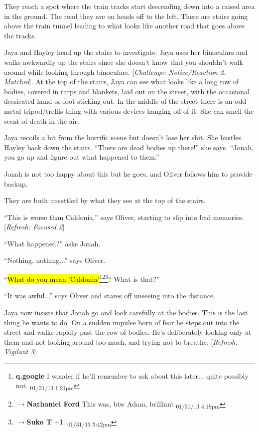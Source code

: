 They reach a spot where the train tracks start descending down into a raised area in the ground.  The road they are on heads off to the left. There are stairs going above the train tunnel leading to what looks like another road that goes above the tracks.



Jaya and Hayley head up the stairs to investigate.  Jaya uses her binoculars and walks awkwardly up the stairs since she doesn't know that you shouldn't walk around while looking through binoculars. {[}\textit{Challenge: Notice/Reaction 2.  Matched}{]}.  At the top of the stairs, Jaya can see what looks like a long row of bodies, covered in tarps and blankets, laid out on the street, with the occasional dessicated hand or foot sticking out.  In the middle of the street there is an odd metal tripod/trellis thing with various devices hanging off of it. She can smell the scent of death in the air. 



Jaya recoils a bit from the horrific scene but doesn't lose her shit. She hustles Hayley back down the stairs.  ``There are dead bodies up there!'' she says.  ``Jonah, you go up and figure out what happened to them.''

Jonah is not too happy about this but he goes, and Oliver follows him to provide backup.



They are both unsettled by what they see at the top of the stairs. 

``This is worse than Caldonia,'' says Oliver, starting to slip into bad memories. {[}\textit{Refresh: Focused 2}{]}

``What happened?'' asks Jonah.

``Nothing, nothing...'' says Oliver.

``\hl{What do you mean 'Caldonia'}\footnote{\textbf{q.google }I wonder if he'll remember to ask about this later...  quite possibly not. \textsubscript{01/31/13 1:21pm}}\footnote{$\rightarrow$\textbf{Nathaniel Ford }This was, btw Adam, brilliant \textsubscript{01/31/13 4:19pm}}\footnote{$\rightarrow$\textbf{Suko T }+1. \textsubscript{01/31/13 5:42pm}}?  What is that?''

``It was awful...'' says Oliver and stares off unseeing into the distance.



Jaya now insists that Jonah go and look carefully at the bodies.  This is the last thing he wants to do.  On a sudden impulse born of fear he steps out into the street and walks rapidly past the row of bodies.  He's deliberately looking only at them and not looking around too much, and trying not to breathe. {[}\textit{Refresh: Vigilant 3}{]}.



